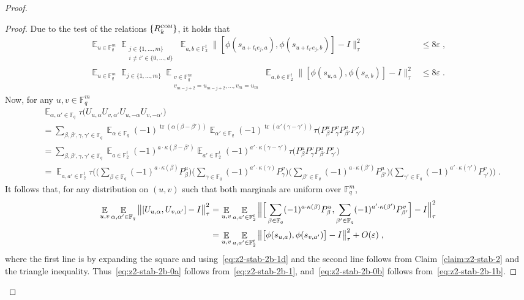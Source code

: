 \documentclass[11pt]{article}
\theoremstyle{definition}
\newcommand{\Id}{\ensuremath{I}}
\DeclareMathOperator*{\Expectation}{\mathbb{E}}
\newcommand{\Es}[1]{\Expectation_{#1}}
\newcommand{\F}{\ensuremath{\mathbb{F}}}
\newcommand{\com}{\textsc{com}}
\newcommand{\eps}{\varepsilon}
\DeclareMathOperator{\tr}{tr}
\begin{document}
\begin{proof}
\begin{proof}
Due to the test of the relations $\{R^\com_k\}$, it holds that 
\begin{align}
\Es{u\in \F_q^m} \Es{\substack{j\in\{1,\ldots,m\} \\ i\neq i' \in \{0,\ldots,d\}}} \Es{a,b\in \F_2^t} \big\| [\phi(s_{u+t_i e_j,a}),\phi(s_{u+t_{i'} e_j,b})] - \Id \big\|_\tau^2&\leq 8\eps\; ,\label{eq:z2-stab-2b-1}\\
\Es{u\in \F_q^m} \Es{j\in\{1,\ldots,m\}} \Es{\substack{v\in \F_q^m \\v_{m-j+2}=u_{m-j+2},\ldots,v_m=u_m}}\Es{a,b\in \F_2^t} \big\| [\phi(s_{u,a}),\phi(s_{v,b})]-\Id\big\|_\tau^2&\leq 8\eps\;.\label{eq:z2-stab-2b-1b}
\end{align}
Now, for any $u,v\in \F_q^m$
\begin{align*}
 &\Es{\alpha,\alpha'\in \F_q}\tau\big( U_{u,\alpha} U_{v,\alpha'} U_{u,-\alpha} U_{v,-\alpha'} \big) \\
&= \sum_{\beta,\beta',\gamma,\gamma'\in \F_q}\Es{\alpha\in \F_q} (-1)^{\tr(\alpha(\beta-\beta'))} \Es{\alpha'\in \F_q} (-1)^{\tr(\alpha'(\gamma-\gamma'))}  \tau(P^{u}_\beta P^{v}_\gamma P^{u}_{\beta'} P^{v}_{\gamma'}\big)\\
&=\sum_{\beta,\beta',\gamma,\gamma'\in \F_q}\Es{a\in\F_2^t} (-1)^{a\cdot\kappa(\beta-\beta')} \Es{a'\in\F_2^t} (-1)^{a'\cdot\kappa(\gamma-\gamma')} \tau(P^{u}_\beta P^{v}_\gamma P^{u}_{\beta'} P^{v}_{\gamma'}\big)\\
&=\Es{a,a'\in\F_2^t}  \tau\Big( \Big(\sum_{\beta\in \F_q} (-1)^{a\cdot \kappa(\beta)} P^{u}_\beta\Big) \Big(\sum_{\gamma\in \F_q} (-1)^{a'\cdot \kappa(\gamma)} P^{v}_\gamma\Big)\Big(\sum_{\beta'\in \F_q} (-1)^{a\cdot \kappa(\beta')} P^{u}_{\beta'}\Big)\Big(\sum_{\gamma'\in \F_q} (-1)^{a'\cdot \kappa(\gamma')} P^{v}_{\gamma'}\Big)\Big)\;.
\end{align*}
It follows that, for any distribution on $(u,v)$ such that both marginals are uniform over $\F_q^m$,
\begin{align}
\Es{u,v} \Es{\alpha,\alpha'\in \F_q} \big\| [U_{u,\alpha} ,U_{v,\alpha'} ]-\Id\big\|_\tau^2
&= \Es{u,v}\Es{a,a'\in \F_2^t} \Big\| \Big[\sum_{\beta\in \F_q} (-1)^{a\cdot \kappa(\beta)} P^{u}_\beta ,\sum_{\beta'\in \F_q} (-1)^{a'\cdot \kappa(\beta')} P^{v}_{\beta'} \Big]-\Id\Big\|_\tau^2\notag\\
&= \Es{u,v}\Es{a,a'\in \F_2^t} \big\| \big[ \phi(s_{u,a}),\phi(s_{v,a'})\big]-\Id\big\|_\tau^2+O({\eps})\;,\label{eq:z2-stab-2b-1d}
\end{align}
where the first line is by expanding the square and using~\eqref{eq:z2-stab-2b-1d} and the second line follows from Claim~\ref{claim:z2-stab-2} and the triangle inequality. Thus~\eqref{eq:z2-stab-2b-0a} follows from~\eqref{eq:z2-stab-2b-1}, and~\eqref{eq:z2-stab-2b-0b} follows from~\eqref{eq:z2-stab-2b-1b}.
\end{proof}


\end{proof}
\end{document}

